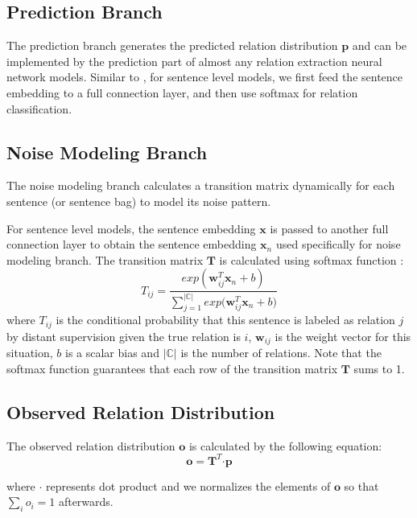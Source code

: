 \subsection{Prediction Branch}
The prediction branch generates the predicted relation distribution $\mathbf{p}$ and can be implemented by the prediction part of almost any relation extraction neural network models. Similar to \cite{luo2016temporal}, for sentence level models, we first feed the sentence embedding to a full connection layer, and then use softmax for relation classification. 

\subsection{Noise Modeling Branch}
The noise modeling branch calculates a transition matrix dynamically for each sentence (or sentence bag) to model its noise pattern.

For sentence level models, the sentence embedding $\mathbf{x}$ is passed to another full connection layer to obtain the sentence embedding $\mathbf{x}_n$ used specifically for noise modeling branch. The transition matrix $\mathbf{T}$ is calculated using softmax function :
\begin{equation}
T_{ij} = \frac{exp({\mathbf{w}_{ij}^T \mathbf{x}_n + b})}{\sum_{j=1}^{|\mathbb{C}|}{exp({\mathbf{w}_{ij}^T \mathbf{x}_n + b}})}
\end{equation}
where $T_{ij}$ is the conditional probability that this sentence is labeled as relation $j$ by distant supervision given the true relation is $i$, $\mathbf{w}_{ij}$ is the weight vector for this situation, $b$ is a scalar bias and $|\mathbb{C}|$ is the number of relations. Note that the softmax function guarantees that each row of the transition matrix $\mathbf{T}$ sums to 1. 

\subsection{Observed Relation Distribution}
The observed relation distribution $\mathbf{o}$ is calculated by the following equation:
 \begin{equation}
\mathbf{o} = \mathbf{T}^T \bm\cdot \mathbf{p}
\label{eq_transition}
 \end{equation}

 where $\bm\cdot$ represents dot product and we normalizes the elements of $\mathbf{o}$ so that $\sum_i{o_i}=1$ afterwards.
 
